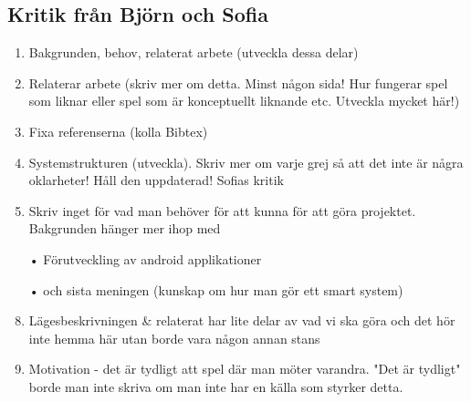 \documentclass[a4paper,11pt]{article}
\begin{document}
\subsection{Kritik från Björn och Sofia}
\begin{enumerate}
\item Bakgrunden, behov, relaterat arbete (utveckla dessa delar)
\item Relaterar arbete (skriv mer om detta. Minst någon sida! Hur fungerar spel som liknar eller spel som är konceptuellt liknande etc. Utveckla mycket här!)
\item Fixa referenserna (kolla Bibtex)
\item Systemstrukturen (utveckla). Skriv mer om varje grej så att det inte är några oklarheter! Håll den uppdaterad!
\newline
Sofias kritik
\item Skriv inget för vad man behöver för att kunna för att göra projektet. Bakgrunden hänger mer ihop med 
\item[•] Förutveckling av android applikationer
\item[•] och sista meningen (kunskap om hur man gör ett smart system)

\item Lägesbeskrivningen \& relaterat har lite delar av vad vi ska göra och det hör inte hemma här utan borde vara någon annan stans
\item Motivation - det är tydligt att spel där man möter varandra. "Det är tydligt" borde man inte skriva om man inte har en källa som styrker detta.
\end{enumerate}
\end{document}
